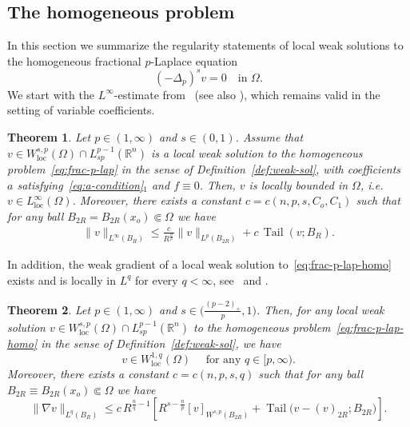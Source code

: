 \documentclass[10pt,letterpaper]{amsart}
\newtheorem{theorem}{Theorem}
\theoremstyle{definition}
\numberwithin{theorem}{section}
\numberwithin{equation}{section}
\newcommand{\R}{\ensuremath{\mathbb{R}}}
\newcommand{\1}{\ensuremath{\mathds{1}}}
\DeclareMathOperator{\loc}{loc}
\DeclareMathOperator{\Tail}{Tail}
\numberwithin{equation}{section}
\begin{document}
\subsection{The homogeneous problem}
In this section we summarize the regularity statements of local weak solutions to the homogeneous fractional $p$-Laplace equation 
\begin{equation} \label{eq:frac-p-lap-homo}
    \left( - \Delta_p\right)^s v = 0
    \quad \mbox{in $\Omega$.}
\end{equation}
We start with the $L^\infty$-estimate from~\cite[Theorem 1.1]{DKP} (see also \cite[Theorem~6.2]{Coz17b}), which remains valid in the setting of variable coefficients.

\begin{theorem}\label{thm:sup-est}
Let $p \in (1,\infty)$ and $s \in (0,1)$. Assume that $v \in W^{s,p}_{\loc}(\Omega) \cap L^{p-1}_{sp}(\R^n)$ is a local weak solution to the homogeneous problem~\eqref{eq:frac-p-lap} in the sense of Definition~\ref{def:weak-sol}, with coefficients $a$ satisfying~\eqref{eq:a-condition}$_1$ and $f \equiv 0$. Then, $v$ is locally bounded in $\Omega$, i.e.~$v\in L^\infty_{\loc}(\Omega)$. Moreover, there exists a constant $c=c(n,p,s,C_o,C_1)$ such that for any ball $B_{2R} = B_{2R}(x_o) \Subset \Omega$ we have 
\begin{align*}
    \|v\|_{L^\infty(B_R)} 
    \le 
    \frac{c}{R^{\frac{n}{p}}} \|v\|_{L^p(B_{2R})} + c\, \Tail(v;B_R).
\end{align*}
\end{theorem}

In addition, the weak gradient of a local weak solution to~\eqref{eq:frac-p-lap-homo} exists and is locally in $L^q$ for every $q < \infty$, see~\cite[Theorem 1.4]{BDLMS-1} and \cite[Theorem~1.2]{BDLMS-2}.

\begin{theorem} \label{thm:Lq-gradient}
Let $p\in(1,\infty)$ and $s \in \big(\frac{(p-2)_+}{p},1\big)$. Then, for any local weak solution $v \in W^{s,p}_{\loc}(\Omega) \cap L^{p-1}_{sp}(\R^n)$ to the homogeneous problem~\eqref{eq:frac-p-lap-homo} in the sense of Definition~\ref{def:weak-sol}, we have 
$$
    v \in W^{1,q}_{\loc}(\Omega) \quad 
    \text{ for any } q \in [p,\infty).
$$
Moreover, there exists a constant $c =  c(n,p,s,q)$ such that for any ball $B_{2R} \equiv B_{2R}(x_o) \Subset \Omega$ we have
$$
    \| \nabla v \|_{L^q(B_{R})} 
    \leq 
    c\, R^{\frac{n}{q}-1} \left[ R^{s- \frac{n}{p}} [v]_{W^{s,p}(B_{2R})} + \Tail \big(v-(v)_{{2R}};B_{2R}\big) \right].
$$
\end{theorem}
\end{document}
